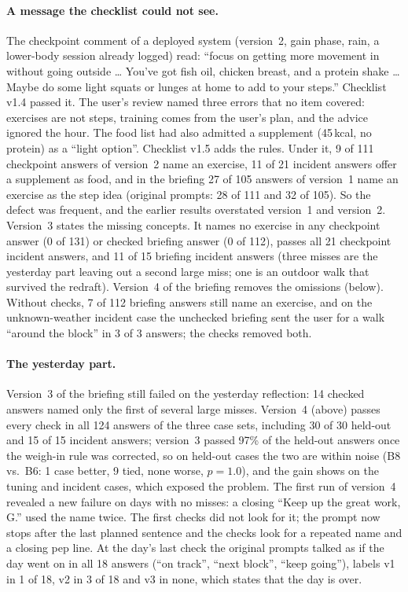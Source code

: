 \documentclass[10pt,twocolumn]{article}
\begin{document}
\paragraph{A message the checklist could not see.} The checkpoint comment of a deployed system (version~2, gain phase,
rain, a lower-body session already logged) read: ``focus on getting more movement in without going outside \ldots{}
You've got fish oil, chicken breast, and a protein shake \ldots{} Maybe do some light squats or lunges at home to add to
your steps.'' Checklist v1.4 passed it. The user's review named three errors that no item covered: exercises are not
steps, training comes from the user's plan, and the advice ignored the hour. The food list had also admitted a
supplement (45\,kcal, no protein) as a ``light option''. Checklist v1.5 adds the rules. Under it, 9 of 111 checkpoint
answers of version~2 name an exercise, 11 of 21 incident answers offer a supplement as food, and in the briefing 27
of 105 answers of version~1 name an exercise as the step idea (original prompts: 28 of 111 and 32 of 105). So the
defect was frequent, and the earlier results overstated version~1 and version~2. Version~3 states the missing
concepts. It names no exercise in any checkpoint answer (0 of 131) or checked briefing answer (0 of 112), passes all 21
checkpoint incident answers, and 11 of 15 briefing incident answers (three misses are the yesterday part leaving out a
second large miss; one is an outdoor walk that survived the redraft). Version~4 of the briefing removes the
omissions (below). Without checks, 7 of
112 briefing answers still name an exercise,
and on the unknown-weather incident case the unchecked briefing sent the user for a walk ``around the block'' in 3 of 3
answers; the checks removed both.

\paragraph{The yesterday part.} Version~3 of the briefing still failed on the yesterday reflection: 14 checked answers
named only the first of several large misses. Version~4 (above) passes every check in all 124 answers of the three case
sets, including 30 of 30 held-out and 15 of 15 incident answers; version~3 passed 97\% of the held-out answers once the
weigh-in rule was corrected, so on held-out cases the two are within noise (B8 vs.\ B6: 1 case better, 9 tied, none
worse, $p=1.0$), and the gain shows on the tuning and incident cases, which exposed the problem. The first run of
version~4 revealed a new failure on days with no misses: a closing ``Keep up the great work, G.'' used the name twice.
The first checks did not look for it; the prompt now stops after the last planned sentence and the checks look for a
repeated name and a closing pep line. At the day's last check the original prompts talked as if the day went on in all 18
answers (``on track'', ``next block'', ``keep going''), labels v1 in 1 of 18, v2 in 3 of 18 and v3 in none, which states
that the day is over.
\end{document}
